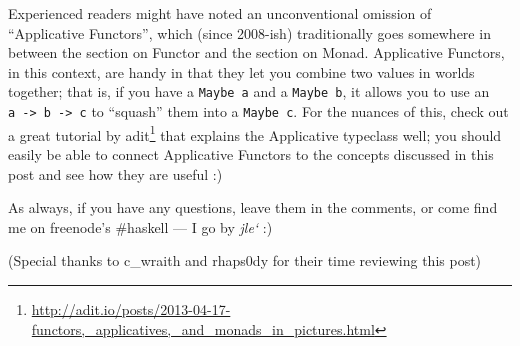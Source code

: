 \documentclass[]{article}
\renewcommand{\href}[2]{#2\footnote{\url{#1}}}
\begin{document}
Experienced readers might have noted an unconventional omission of ``Applicative Functors'', which
(since 2008-ish) traditionally goes somewhere in between the section on Functor and the section on
Monad. Applicative Functors, in this context, are handy in that they let you combine two values in
worlds together; that is, if you have a \texttt{Maybe\ a} and a \texttt{Maybe\ b}, it allows you to
use an \texttt{a\ -\textgreater{}\ b\ -\textgreater{}\ c} to ``squash'' them into a
\texttt{Maybe\ c}. For the nuances of this, check out a great
\href{http://adit.io/posts/2013-04-17-functors,_applicatives,_and_monads_in_pictures.html}{tutorial
by adit} that explains the Applicative typeclass well; you should easily be able to connect
Applicative Functors to the concepts discussed in this post and see how they are useful :)

As always, if you have any questions, leave them in the comments, or come find me on freenode's
\#haskell --- I go by \emph{jle`} :)

(Special thanks to c\_wraith and rhaps0dy for their time reviewing this post)
\end{document}

